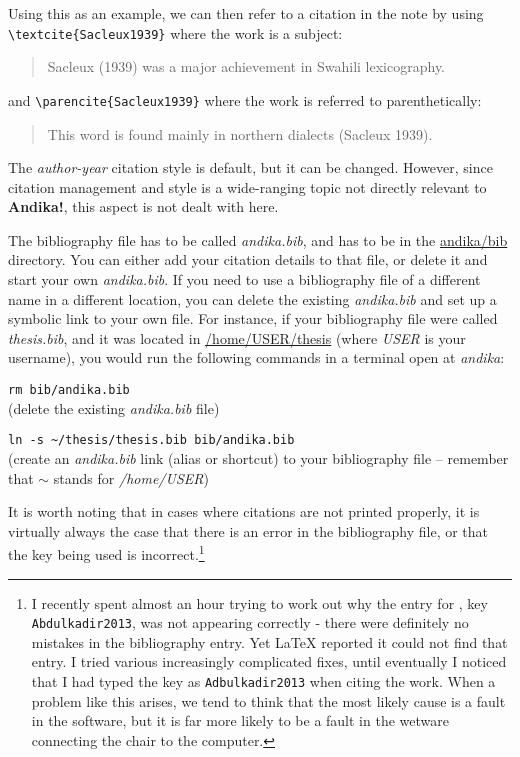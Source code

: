Using this as an example, we can then refer to a citation in the note by using \verb|\textcite{Sacleux1939}| where the work is a subject:
\begin{quotation}
Sacleux (1939) was a major achievement in Swahili lexicography.
\end{quotation}
and \verb|\parencite{Sacleux1939}| where the work is referred to parenthetically:
\begin{quotation}
This word is found mainly in northern dialects (Sacleux 1939).
\end{quotation}

The \textit{author-year} citation style is default, but it can be changed.  However, since citation management and style is a wide-ranging topic not directly relevant to \textbf{Andika!}, this aspect is not dealt with here.

The bibliography file has to be called \textit{andika.bib}, and has to be in the \url{andika/bib} directory.  You can either add your citation details to that file, or delete it and start your own \textit{andika.bib}.  If you need to use a bibliography file of a different name in a different location, you can delete the existing \textit{andika.bib} and set up a symbolic link to your own file.  For instance, if your bibliography file were called \textit{thesis.bib}, and it was located in \url{/home/USER/thesis} (where \textit{USER} is your username), you would run the following commands in a terminal open at \textit{andika}:

\verb|rm bib/andika.bib|\\
(delete the existing \textit{andika.bib} file)

\verb|ln -s ~/thesis/thesis.bib bib/andika.bib|\\
(create an \textit{andika.bib} link (alias or shortcut) to your bibliography file -- remember that $\sim$ stands for \textit{/home/USER})

It is worth noting that in cases where citations are not printed properly, it is virtually always the case that there is an error in the bibliography file, or that the key being used is incorrect.\footnote{I recently spent almost an hour trying to work out why the entry for \citet{Abdulkadir2013}, key \texttt{Abdulkadir2013}, was not appearing correctly - there were definitely no mistakes in the bibliography entry.  Yet LaTeX reported it could not find that entry.  I tried various increasingly complicated fixes, until eventually I noticed that I had typed the key as \texttt{Adbulkadir2013} when citing the work.  When a problem like this arises, we tend to think that the most likely cause is a fault in the software, but it is far more likely to be a fault in the wetware connecting the chair to the computer.}


